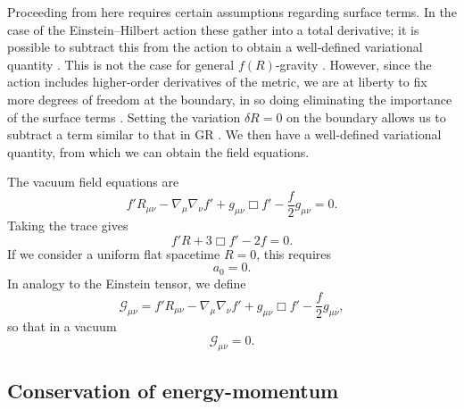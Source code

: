 Proceeding from here requires certain assumptions regarding surface terms. In the case of the Einstein--Hilbert action these gather into a total derivative; it is possible to subtract this from the action to obtain a well-defined variational quantity \citep{York1972, Gibbons1977}. This is not the case for general $f(R)$-gravity \citep{Madsen1989}. However, since the action includes higher-order derivatives of the metric, we are at liberty to fix more degrees of freedom at the boundary, in so doing eliminating the importance of the surface terms \citep{Dyer2009a, Sotiriou2010}. Setting the variation $\delta R = 0$ on the boundary allows us to subtract a term similar to that in GR \citep{Guarnizo2010}. We then have a well-defined variational quantity, from which we can obtain the field equations.

The vacuum field equations are
\begin{equation}
f'R_{\mu\nu} - \nabla_\mu\nabla_\nu f' + g_{\mu\nu}\Box f' - \frac{f}{2}g_{\mu\nu} = 0.
\label{eq:Field_eq}
\end{equation}
Taking the trace gives
\begin{equation}
f'R + 3\Box f' - 2f = 0.
\label{eq:Trace_eq}
\end{equation}
If we consider a uniform flat spacetime $R = 0$, this requires \citep{Capozziello2007}
\begin{equation}
a_0 = 0.
\label{eq:a_0}
\end{equation}
In analogy to the Einstein tensor, we define
\begin{equation}
\mathcal{G}_{\mu\nu} = f'R_{\mu\nu} - \nabla_\mu\nabla_\nu f' + g_{\mu\nu}\Box f' - \frac{f}{2}g_{\mu\nu},
\label{eq:G_tensor}
\end{equation}
so that in a vacuum
\begin{equation}
\mathcal{G}_{\mu\nu} = 0.
\end{equation}

\subsection{Conservation of energy-momentum}

